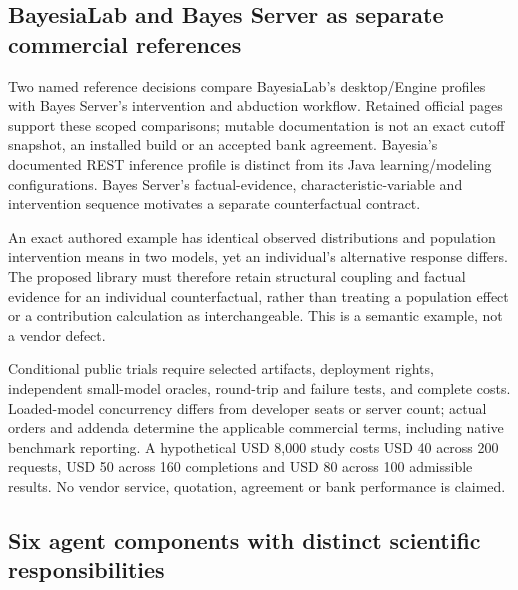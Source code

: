 \hypertarget{bayesialab-and-bayes-server-as-separate-commercial-references}{%
\subsection{BayesiaLab and Bayes Server as separate commercial
references}\label{bayesialab-and-bayes-server-as-separate-commercial-references}}

Two named reference decisions compare BayesiaLab's desktop/Engine
profiles with Bayes Server's intervention and abduction workflow.
Retained official pages support these scoped comparisons; mutable
documentation is not an exact cutoff snapshot, an installed build or an
accepted bank agreement. Bayesia's documented REST inference profile is
distinct from its Java learning/modeling configurations. Bayes Server's
factual-evidence, characteristic-variable and intervention sequence
motivates a separate counterfactual contract.
\citep{exec13_bayesia_api,exec13_bayesia_professional,exec13_ci_bayesia_criteria,exec13_ci_bayesia_surgery,exec13_ci_bayesia_matching,exec13_ci_bayesserver_causality,exec14_ci_release_history}

An exact authored example has identical observed distributions and
population intervention means in two models, yet an individual's
alternative response differs. The proposed library must therefore retain
structural coupling and factual evidence for an individual
counterfactual, rather than treating a population effect or a
contribution calculation as interchangeable. This is a semantic example,
not a vendor defect.
\citep{exec13_ci_bayesia_counterfactual,exec25_bn_commercial_choice}

Conditional public trials require selected artifacts, deployment rights,
independent small-model oracles, round-trip and failure tests, and
complete costs. Loaded-model concurrency differs from developer seats or
server count; actual orders and addenda determine the applicable
commercial terms, including native benchmark reporting. A hypothetical
USD 8,000 study costs USD 40 across 200 requests, USD 50 across 160
completions and USD 80 across 100 admissible results. No vendor service,
quotation, agreement or bank performance is claimed.
\citep{exec13_bayesia_api,exec14_ci_purchase,exec14_ci_eula,exec25_bn_commercial_choice}

\hypertarget{six-agent-components-with-distinct-scientific-responsibilities}{%
\subsection{Six agent components with distinct scientific
responsibilities}\label{six-agent-components-with-distinct-scientific-responsibilities}}

